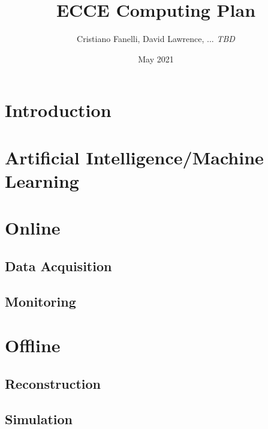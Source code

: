 \documentclass{article}
\title{ECCE Computing Plan}
\author{Cristiano Fanelli, David Lawrence, ... \emph{TBD}}
\date{May 2021}
\begin{document}
\maketitle

\section{Introduction}

\cite{eic_yellow_report_v1_1}\cite{sphenix_computing_plan_2019}

\section{Artificial Intelligence/Machine Learning}

\section{Online}

\subsection{Data Acquisition}

\subsection{Monitoring}

\section{Offline}

\subsection{Reconstruction}

\subsection{Simulation}
\end{document}

